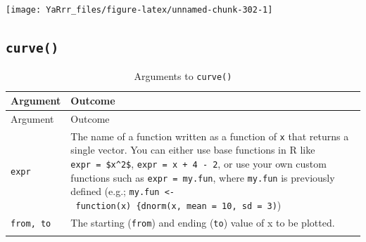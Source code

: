 \documentclass[]{book}
\theoremstyle{definition}
\theoremstyle{definition}
\theoremstyle{remark}
\begin{document}
\begin{center}\texttt{[image: YaRrr\_files/figure-latex/unnamed-chunk-302-1]} \end{center}

\subsection{\texorpdfstring{\texttt{curve()}}{curve()}}\label{curve}

\begin{longtable}[]{@{}ll@{}}
\caption{\label{tab:curvearguments} Arguments to
\texttt{curve()}}\tabularnewline
\toprule
\begin{minipage}[b]{0.14\columnwidth}\raggedright\strut
Argument\strut
\end{minipage} & \begin{minipage}[b]{0.71\columnwidth}\raggedright\strut
Outcome\strut
\end{minipage}\tabularnewline
\midrule
\endfirsthead
\toprule
\begin{minipage}[b]{0.14\columnwidth}\raggedright\strut
Argument\strut
\end{minipage} & \begin{minipage}[b]{0.71\columnwidth}\raggedright\strut
Outcome\strut
\end{minipage}\tabularnewline
\midrule
\endhead
\begin{minipage}[t]{0.14\columnwidth}\raggedright\strut
\texttt{expr}\strut
\end{minipage} & \begin{minipage}[t]{0.71\columnwidth}\raggedright\strut
The name of a function written as a function of \texttt{x} that returns
a single vector. You can either use base functions in R like
\texttt{expr\ =\ \$x\^{}2\$}, \texttt{expr\ =\ x\ +\ 4\ -\ 2}, or use
your own custom functions such as \texttt{expr\ =\ my.fun}, where
\texttt{my.fun} is previously defined (e.g.;
\texttt{my.fun\ \textless{}-\ function(x)\ \{dnorm(x,\ mean\ =\ 10,\ sd\ =\ 3)})\strut
\end{minipage}\tabularnewline
\begin{minipage}[t]{0.14\columnwidth}\raggedright\strut
\texttt{from,\ to}\strut
\end{minipage} & \begin{minipage}[t]{0.71\columnwidth}\raggedright\strut
The starting (\texttt{from}) and ending (\texttt{to}) value of x to be
plotted.\strut
\end{minipage}\tabularnewline
\begin{minipage}[t]{0.14\columnwidth}\raggedright\strut

\end{minipage}
\end{longtable}
\end{document}

